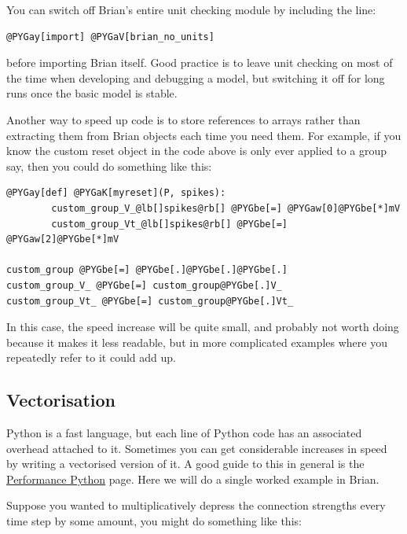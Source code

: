 \documentclass[letterpaper,10pt]{manual}
\begin{document}
You can switch off Brian's entire unit checking module
by including the line:

\begin{Verbatim}[commandchars=@\[\]]
@PYGay[import] @PYGaV[brian_no_units]
\end{Verbatim}

before importing Brian itself. Good practice is to leave unit checking
on most of the time when developing and debugging a model, but
switching it off for long runs once the basic model is stable.

Another way to speed up code is to store references to arrays rather
than extracting them from Brian objects each time you need them. For
example, if you know the custom reset object in the code above is
only ever applied to a group  say, then you could
do something like this:

\begin{Verbatim}[commandchars=@\[\]]
@PYGay[def] @PYGaK[myreset](P, spikes):
        custom_group_V_@lb[]spikes@rb[] @PYGbe[=] @PYGaw[0]@PYGbe[*]mV
        custom_group_Vt_@lb[]spikes@rb[] @PYGbe[=] @PYGaw[2]@PYGbe[*]mV

custom_group @PYGbe[=] @PYGbe[.]@PYGbe[.]@PYGbe[.]
custom_group_V_ @PYGbe[=] custom_group@PYGbe[.]V_
custom_group_Vt_ @PYGbe[=] custom_group@PYGbe[.]Vt_
\end{Verbatim}

In this case, the speed increase will be quite small, and probably
not worth doing because it makes it less readable, but in more
complicated examples where you repeatedly refer to 
it could add up.

\subsection{Vectorisation}

Python is a fast language, but each line of Python code has an
associated overhead attached to it. Sometimes you can get considerable
increases in speed by writing a vectorised version of it. A good guide
to this in general is the \href{http://www.scipy.org/PerformancePython}{Performance Python}
page. Here we will do a single worked example in Brian.

Suppose you wanted to multiplicatively depress the connection
strengths every time step by some amount, you might do something like
this:
\end{document}
